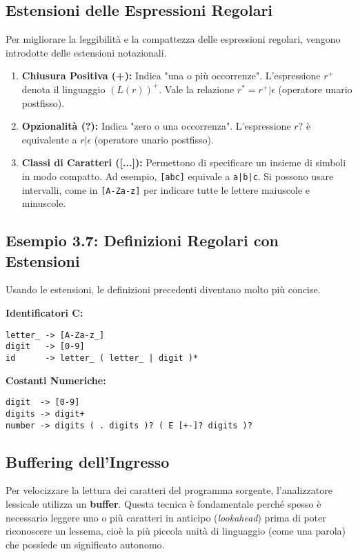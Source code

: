 \subsection{Estensioni delle Espressioni Regolari }
Per migliorare la leggibilità e la compattezza delle espressioni regolari, vengono introdotte delle estensioni notazionali.
\begin{enumerate}
    \item \textbf{Chiusura Positiva (+):} Indica "una o più occorrenze". L'espressione $r^+$ denota il linguaggio $(L(r))^+$. Vale la relazione $r^* = r^+ | \epsilon$ (operatore unario postfisso).

    \item \textbf{Opzionalità (?):} Indica "zero o una occorrenza". L'espressione $r?$ è equivalente a $r|\epsilon$ (operatore unario postfisso).

    \item \textbf{Classi di Caratteri ([...]):} Permettono di specificare un insieme di simboli in modo compatto. Ad esempio, \texttt{[abc]} equivale a \texttt{a|b|c}. Si possono usare intervalli, come in \texttt{[A-Za-z]} per indicare tutte le lettere maiuscole e minuscole.
\end{enumerate}

\subsection{Esempio 3.7: Definizioni Regolari con Estensioni}
Usando le estensioni, le definizioni precedenti diventano molto più concise.

\textbf{Identificatori C:}
\begin{Verbatim}[frame=single]
letter_ -> [A-Za-z_]
digit   -> [0-9]
id      -> letter_ ( letter_ | digit )*
\end{Verbatim}

\textbf{Costanti Numeriche:}
\begin{Verbatim}[frame=single]
digit  -> [0-9]
digits -> digit+
number -> digits ( . digits )? ( E [+-]? digits )?
\end{Verbatim}

\subsection{Buffering dell'Ingresso }

Per velocizzare la lettura dei caratteri del programma sorgente, l'analizzatore lessicale utilizza un \textbf{buffer}. Questa tecnica è fondamentale perché spesso è necessario leggere uno o più caratteri in anticipo (\textit{lookahead}) prima di poter riconoscere un lessema, cioè la più piccola unità di linguaggio (come una parola) che possiede un significato autonomo.

